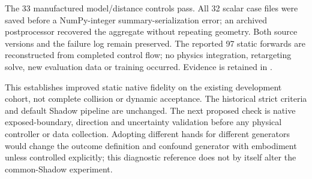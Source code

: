 The 33 manufactured model/distance controls pass. All 32 scalar case files
were saved before a NumPy-integer summary-serialization error; an archived
postprocessor recovered the aggregate without repeating geometry. Both source
versions and the failure log remain preserved. The reported 97 static forwards
are reconstructed from completed control flow; no physics integration,
retargeting solve, new evaluation data or training occurred.
Evidence is retained in
.

This establishes improved static native fidelity on the existing development
cohort, not complete collision or dynamic acceptance. The historical strict
criteria and default Shadow pipeline are unchanged. The next proposed check
is native exposed-boundary, direction and uncertainty validation before any
physical controller or data collection. Adopting different hands for different
generators would change the outcome definition and confound generator with
embodiment unless controlled explicitly; this diagnostic reference does not
by itself alter the common-Shadow experiment.

